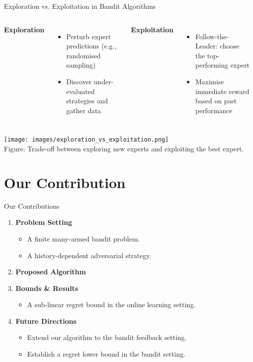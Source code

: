 \documentclass{beamer}
\begin{document}
\begin{frame}{Exploration vs. Exploitation in Bandit Algorithms}
  \begin{columns}[T,onlytextwidth]
    \textbf{Exploration}
      \begin{itemize}
        \item {Perturb expert predictions (e.g., randomised sampling)}
        \item {Discover under-evaluated strategies and gather data}
      \end{itemize}
    \textbf{Exploitation}
      \begin{itemize}
        \item {Follow-the-Leader: choose the top-performing expert}
        \item { Maximise immediate reward based on past performance}
      \end{itemize}
  \end{columns}

  \vspace{1em}
  \begin{center}
    \texttt{[image: images/exploration\_vs\_exploitation.png]}\\
    {\small Figure: Trade-off between exploring new experts and exploiting the best expert.}
  \end{center}
\end{frame}

\section{Our Contribution}

\begin{frame}{Our Contributions}
    \begin{enumerate}
        \item \textbf{Problem Setting}
        \begin{itemize}
            \item A finite many-armed bandit problem.
            \item A history-dependent adversarial strategy.
        \end{itemize}

        \item \textbf{Proposed Algorithm}
        \item \textbf{Bounds \& Results}
        \begin{itemize}
            \item A sub-linear regret bound in the online learning setting.
        \end{itemize}

        \item \textbf{Future Directions}
        \begin{itemize}
            \item Extend our algorithm to the bandit feedback setting.
            \item Establish a regret lower bound in the bandit setting.
        \end{itemize}
    \end{enumerate}
\end{frame}
\end{document}
